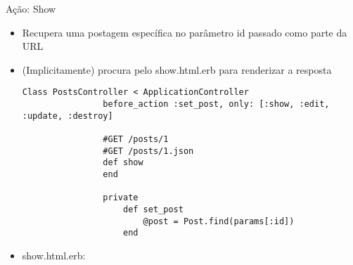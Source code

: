 \begin{frame}{Ação: Show}
	\begin{itemize}
		\item Recupera uma postagem específica no parâmetro \alert{id} passado como parte da URL
		\item (Implicitamente) procura pelo \alert{show.html.erb} para renderizar a resposta
		\begin{lstlisting}[style=RubyInputStyle, caption=posts_controller.rb]
			Class PostsController < ApplicationController
				before_action :set_post, only: [:show, :edit, :update, :destroy]
				
				#GET /posts/1
				#GET /posts/1.json 
				def show 
				end 
				
				private
					def set_post 
						@post = Post.find(params[:id])
					end 
		\end{lstlisting}		
		
		\item \alert{show.html.erb}:
		
				
	\end{itemize}	
\end{frame}